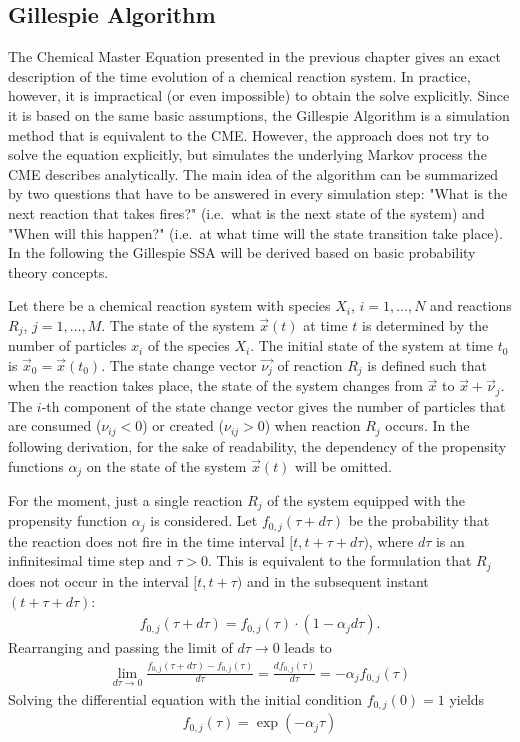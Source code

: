 \subsection{Gillespie Algorithm}
The Chemical Master Equation presented in the previous chapter gives an exact description of the time evolution of a chemical reaction system. In practice, however, it is impractical (or even impossible) to obtain the solve explicitly. Since it is based on the same basic assumptions, the Gillespie Algorithm is a simulation method that is equivalent to the CME. However, the approach does not try to solve the equation explicitly, but simulates the underlying Markov process the CME describes analytically. The main idea of the algorithm can be summarized by two questions that have to be answered in every simulation step: "What is the next reaction that takes fires?" (i.e.\ what is the next state of the system) and "When will this happen?" (i.e.\ at what time will the state transition take place). In the following the Gillespie SSA will be derived based on basic probability theory concepts. 

Let there be a chemical reaction system with species $X_i$, $i=1, \ldots,N$ and reactions $R_j$, $j=1, \ldots,M$. The state of the system $\vec{x}(t)$ at time $t$ is determined by the number of particles $x_i$ of the species $X_i$. The initial state of the system at time $t_0$ is $\vec{x}_0 = \vec{x}(t_0)$. The state change vector $\vec{\nu_j}$ of reaction $R_j$ is defined such that when the reaction takes place, the state of the system changes from $\vec{x}$ to $\vec{x} + \vec{\nu}_j$. The $i$-th component of the state change vector gives the number of particles that are consumed ($\nu_{ij} < 0$) or created ($\nu_{ij} > 0$) when reaction $R_j$ occurs. In the following derivation, for the sake of readability, the dependency of the propensity functions $\alpha_j$ on the state of the system $\vec{x}(t)$ will be omitted.

For the moment, just a single reaction $R_j$ of the system equipped with the propensity function $\alpha_j$ is considered. Let $f_{0,j}(\tau+d\tau)$ be the probability that the reaction does not fire in the time interval $\lbrack t,t+\tau+d\tau)$, where $d\tau$ is an infinitesimal time step and $\tau > 0$. This is equivalent to the formulation that $R_j$ does not occur in the interval $\lbrack t,t+\tau)$ and in the subsequent instant $(t+\tau+d\tau)$:
\begin{align}
f_{0,j}(\tau + d\tau) = f_{0,j}(\tau) \cdot (1-\alpha_j d\tau). 
\end{align}
Rearranging and passing the limit of $d\tau \to 0$ leads to
\begin{align}
\lim_{d\tau \to 0} \frac{f_{0,j}(\tau + d\tau) - f_{0,j}(\tau)}{d\tau} = \frac{df_{0,j}(\tau)}{d\tau} = -\alpha_j f_{0,j}(\tau)
\end{align}
Solving the differential equation with the initial condition $f_{0,j}(0) = 1$ yields
\begin{align}
\label{eq:probnot}
f_{0,j}(\tau) = \exp(-\alpha_j \tau)
\end{align}

